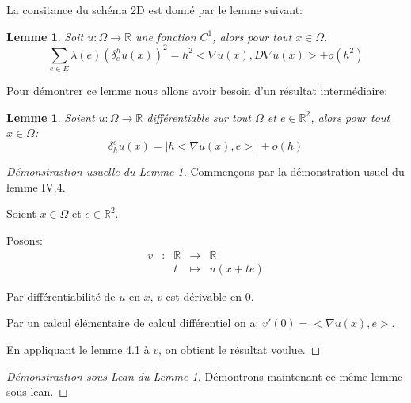 \documentclass[12pt]{article}
\def\bR{\mathbb{R}}
\newtheorem{lemma}[theorem]{Lemme}
\numberwithin{equation}{section}
\begin{document}

La consitance du schéma 2D est donné par le lemme suivant:
\begin{lemma}
\label{lemme:consistance_2D}
Soit $u: \Omega \to \bR$ une fonction $C^1$, alors pour tout $x\in\Omega$.
\begin{equation}
     \sum_{e \in E}\lambda(e)(\delta_e^hu(x))^2 = h^2<\nabla u(x), D\nabla u(x)>+o(h^2)
\end{equation}

\end{lemma}
Pour démontrer ce lemme nous allons avoir besoin d'un résultat intermédiaire:
\begin{lemma}
\label{lemme_intermédire}
Soient $u: \Omega \to \bR$ différentiable sur tout $\Omega$ et $e\in \bR^2$, alors pour tout $x\in\Omega$:
\begin{equation}
    \delta^e_hu(x)=|h<\nabla u(x),e>|+o(h)
\end{equation}
\end{lemma}

\begin{proof}[Démonstrastion usuelle du Lemme \ref{lemme_intermédire}]
Commençons par la démonstration usuel du lemme IV.4.

Soient $x\in \Omega$ et $e\in \bR^2$.

Posons:
\begin{equation*}
\begin{array}{ccccc}
    v &: & \bR & \to & \bR \\
     & & t & \mapsto &  u(x+te)
\end{array}
\end{equation*}

Par différentiabilité de $u$ en $x$, $v$ est dérivable en 0.

Par un calcul élémentaire de calcul différentiel on a: $v'(0)=<\nabla u(x),e>$.

En appliquant le lemme 4.1 à $v$, on obtient le résultat voulue.
\end{proof}
\begin{proof}[Démonstrastion sous Lean du Lemme \ref{lemme_intermédire}]
  \label{Démonstration sous Lean du lemme 4.3:}
  Démontrons maintenant ce même lemme sous lean.

\end{proof}
\end{document}
